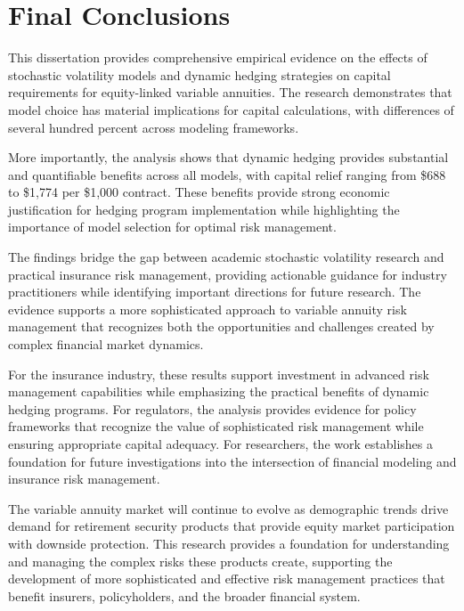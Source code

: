 \documentclass[12pt,a4paper]{report}
\begin{document}
\section{Final Conclusions}

This dissertation provides comprehensive empirical evidence on the effects of stochastic volatility models and dynamic hedging strategies on capital requirements for equity-linked variable annuities. The research demonstrates that model choice has material implications for capital calculations, with differences of several hundred percent across modeling frameworks.

More importantly, the analysis shows that dynamic hedging provides substantial and quantifiable benefits across all models, with capital relief ranging from \$688 to \$1,774 per \$1,000 contract. These benefits provide strong economic justification for hedging program implementation while highlighting the importance of model selection for optimal risk management.

The findings bridge the gap between academic stochastic volatility research and practical insurance risk management, providing actionable guidance for industry practitioners while identifying important directions for future research. The evidence supports a more sophisticated approach to variable annuity risk management that recognizes both the opportunities and challenges created by complex financial market dynamics.

For the insurance industry, these results support investment in advanced risk management capabilities while emphasizing the practical benefits of dynamic hedging programs. For regulators, the analysis provides evidence for policy frameworks that recognize the value of sophisticated risk management while ensuring appropriate capital adequacy. For researchers, the work establishes a foundation for future investigations into the intersection of financial modeling and insurance risk management.

The variable annuity market will continue to evolve as demographic trends drive demand for retirement security products that provide equity market participation with downside protection. This research provides a foundation for understanding and managing the complex risks these products create, supporting the development of more sophisticated and effective risk management practices that benefit insurers, policyholders, and the broader financial system.



\end{document}
